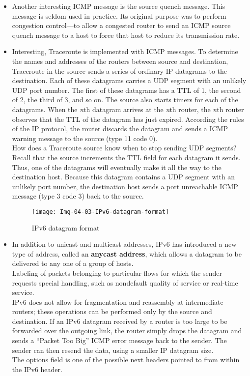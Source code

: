 \begin{itemize}
\item
Another interesting ICMP message is the source quench message. This message is seldom used in practice. Its original purpose was to perform congestion control---to allow a congested router to send an ICMP source quench message to a host to force that host to reduce its transmission rate.

\item
Interesting, Traceroute is implemented with ICMP messages. To determine the names and addresses of the routers between source and destination, Traceroute in the source sends a series of ordinary IP datagrams to the destination. Each of these datagrams carries a UDP segment with an unlikely UDP port number. The first of these datagrams has a TTL of 1, the second of 2, the third of 3, and so on. The source also starts timers for each of the datagrams. When the \textit{n}th datagram arrives at the \textit{n}th router, the \textit{n}th router observes that the TTL of the datagram has just expired. According the rules of the IP protocol, the router discards the datagram and sends a ICMP warning message to the source (type 11 code 0).\\
How does a Traceroute source know when to stop sending UDP segments? Recall that the source increments the TTL field for each datagram it sends. Thus, one of the datagrams will eventually make it all the way to the destination host. Because this datagram contains a UDP segment with an unlikely port number, the destination host sends a port unreachable ICMP message (type 3 code 3) back to the source.

\begin{figure}[h]
\texttt{[image: Img-04-03-IPv6-datagram-format]}
\centering
\caption{IPv6 datagram format}
\label{fig:fig-04-03}
\end{figure}

\item
In addition to unicast and multicast addresses, IPv6 has introduced a new type of address, called an \textbf{anycast address}, which allows a datagram to be delivered to any one of a group of hosts.\\
Labeling of packets belonging to particular flows for which the sender requests special handling, such as nondefault quality of service or real-time service.\\
IPv6 does not allow for fragmentation and reassembly at intermediate routers; these operations can be performed only by the source and destination. If an IPv6 datagram received by a router is too large to be forwarded over the outgoing link, the router simply drops the datagram and sends a ``Packet Too Big'' ICMP error message back to the sender. The sender can then resend the data, using a smaller IP datagram size.\\
The options field is one of the possible next headers pointed to from within the IPv6 header.


\end{itemize}
